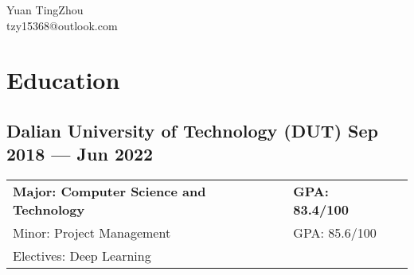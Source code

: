 \documentclass[a4,12pt]{article}
\newcommand{\hskills}[1]{
\textbf{\bfseries #1} }
\begin{document}
\begin{center}
    \begin{minipage}[b]{0.5\textwidth}
            \centering
            {\huge Yuan TingZhou} \\ %
            \vspace{0.1cm}
            tzy15368@outlook.com
    \end{minipage}%
    
\vspace{-0.35cm} 
\end{center}

\section{\textbf{Education}}
\subsection*{Dalian University of Technology (DUT) \hfill \textbf{Sep 2018 --- Jun 2022}}
\begin{tabular}{p{20em} p{21em} p{43em}}
\textbf{Major: Computer Science and Technology} & \textbf{GPA: 83.4/100}\\
Minor: Project Management & GPA: 85.6/100\\
Electives: Deep Learning & \textbf{}\\

\end{tabular}
\end{document}
